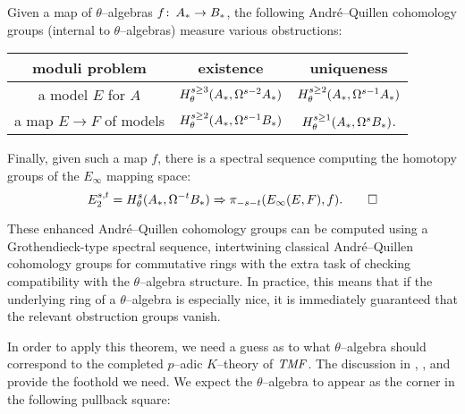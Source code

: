\begin{theorem}
Given a map of $\theta$--algebras $f\colon\thinspace A_* \to B_*$, the following Andr\'e--Quillen cohomology groups (internal to $\theta$--algebras) measure various obstructions:
\begin{center}
\begin{tabular}{@{}ccc@{}} \toprule
moduli problem & existence & uniqueness \\
\midrule
a model $E$ for $A$ & $H^{s \ge 3}_\theta(A_*, \Omega^{s-2} A_*)$ & $H^{s \ge 2}_\theta(A_*, \Omega^{s-1} A_*)$ \\
a map $E \to F$ of models & $H^{s \ge 2}_\theta(A_*, \Omega^{s-1} B_*)$ & $H^{s \ge 1}_\theta(A_*, \Omega^s B_*)$. \\
 \bottomrule
\end{tabular}
\end{center}
Finally, given such a map $f$, there is a spectral sequence computing the homotopy groups of the $E_\infty$ mapping space: \[E_2^{s, t} = H^s_\theta(A_*, \Omega^{-t} B_*) \Rightarrow \pi_{-s-t}(E_\infty(E, F), f). \qed\]
\end{theorem}

\begin{remark}
These enhanced Andr\'e--Quillen cohomology groups can be computed using a Grothendieck-type spectral sequence, intertwining classical Andr\'e--Quillen cohomology groups for commutative rings with the extra task of checking compatibility with the $\theta$--algebra structure.  In practice, this means that if the underlying ring of a $\theta$--algebra is especially nice, it is immediately guaranteed that the relevant obstruction groups vanish.
\end{remark}

In order to apply this theorem, we need a guess as to what $\theta$--algebra should correspond to the completed $p$--adic $K$--theory of $\mathit{TMF}$.  The discussion in , , and  provide the foothold we need.  We expect the $\theta$--algebra to appear as the corner in the following pullback square:

\begin{center}
\end{center}

